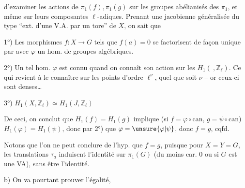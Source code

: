 d'examiner les actions de $\pi_1(f),\pi_1(g)$ sur les groupes abélianisés des $\pi_1$, et même sur leurs composantes $\ell$-adiques. Prenant une jacobienne généralisée du type ``ext. d'une V.A. par un tore'' de $X$, on sait que

1°) Les morphismes $f:X\longrightarrow G$ tels que $f(a)=0$ se factorisent de façon unique par
avec $\varphi$ un hom. de groupes algébriques.

2°)  Un tel hom. $\varphi$ est connu quand on connaît son action sur les $H_1(\ ,\mathbb Z_\ell)$. Ce qui revient à le connaître sur les points d'ordre $\ell^\nu$, quel que soit $\nu$ -- or ceux-ci sont denses\ldots

3°) $H_1(X,\mathbb Z_\ell)\simeq H_1(J,\mathbb Z_\ell)$

De ceci,  on conclut  que $H_1(f)=H_1(g)$ implique (si $f=\varphi\circ\mathrm{can}$, $g=\psi\circ\mathrm{can}$) $H_1(\varphi)=H_1(\psi)$, donc par 2°) que $\varphi=\unsure{\varphi|\psi}$, donc $f=g$, cqfd.

 Notons que l'on ne peut conclure de l'hyp.  que $f=g$, puisque pour $X=Y=G$, les translations $\tau_a$ induisent l'identité sur $\pi_1(G)$ (du moins  car. $0$ ou si $G$ est une VA), sans être l'identité.

b) On va pourtant prouver l'égalité,

